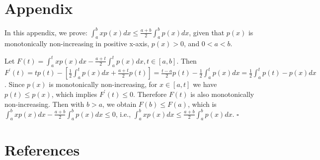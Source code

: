 \documentclass[smallabstract,smallcaptions]{dccpaper}
\begin{document}
\section*{Appendix}
\label{sec:appendix}

In this appendix, we prove: $\int_a^b xp(x)dx \le \frac{a+b}{2} \int_a^b p(x)dx$, given that $p(x)$ is monotonically non-increasing in positive x-axis, $p(x) > 0$, and $0 < a < b$.

Let $F(t) = \int_a^t xp(x)dx - \frac{a+t}{2} \int_a^t p(x)dx, t \in [a, b]$. Then $F^{\prime}(t) = tp(t) - [\frac{1}{2}\int_a^t p(x)dx + \frac{a+t}{2}p(t)] = \frac{t-a}{2}p(t) - \frac{1}{2}\int_a^t p(x)dx = \frac{1}{2}\int_a^t p(t)-p(x)dx $. Since $p(x)$ is monotonically non-increasing, for $x \in [a, t]$ we have $p(t) \le p(x)$, which implies $F^{\prime}(t) \le 0$. Therefore $F(t)$ is also monotonically non-increasing. Then with $b > a$, we obtain $F(b) \le F(a)$, which is $\int_a^b xp(x)dx - \frac{a+b}{2} \int_a^b p(x)dx \le 0$, i.e., $\int_a^b xp(x)dx \le \frac{a+b}{2} \int_a^b p(x)dx$. $\square$

\section*{References}


\end{document}
